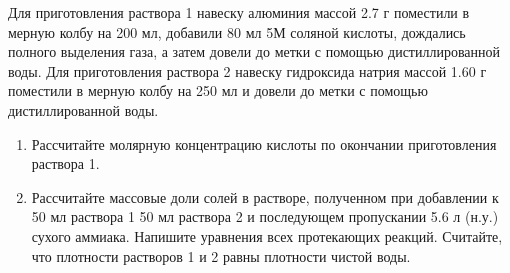
Для приготовления раствора 1 навеску алюминия массой 2.7 г поместили в мерную колбу на 200 мл, добавили 80 мл 5М 
соляной кислоты, дождались полного выделения газа, а затем довели до метки с помощью дистиллированной воды. Для 
приготовления раствора 2 навеску гидроксида натрия массой 1.60 г поместили в мерную колбу на 250 мл и довели до 
метки с помощью дистиллированной воды.

\begin{enumerate}
    \item Рассчитайте молярную концентрацию кислоты по окончании приготовления раствора 1.
    \item Рассчитайте массовые доли солей в растворе, полученном при добавлении к 50 мл раствора 1 50 мл 
    раствора 2 и последующем пропускании 5.6 л (н.у.) сухого аммиака. Напишите уравнения всех протекающих реакций. 
    Считайте, что плотности растворов 1 и 2 равны плотности чистой воды.
\end{enumerate}
